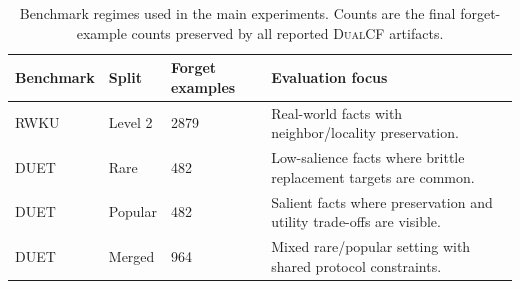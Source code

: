 \begin{table}[t]
\centering
\small
\setlength{\tabcolsep}{4pt}
\renewcommand{\arraystretch}{1.0}
\begin{tabularx}{\linewidth}{l l p{1.2cm} p{3.02cm}}
\toprule
Benchmark & Split & Forget examples & Evaluation focus \\
\midrule
RWKU & Level 2 & 2879 & Real-world facts with neighbor/locality preservation. \\
DUET & Rare & 482 & Low-salience facts where brittle replacement targets are common. \\
DUET & Popular & 482 & Salient facts where preservation and utility trade-offs are visible. \\
DUET & Merged & 964 & Mixed rare/popular setting with shared protocol constraints. \\
\bottomrule
\end{tabularx}
\caption{Benchmark regimes used in the main experiments. Counts are the final forget-example counts preserved by all reported \textsc{DualCF} artifacts.}
\label{tab:benchmark-summary}
\end{table}